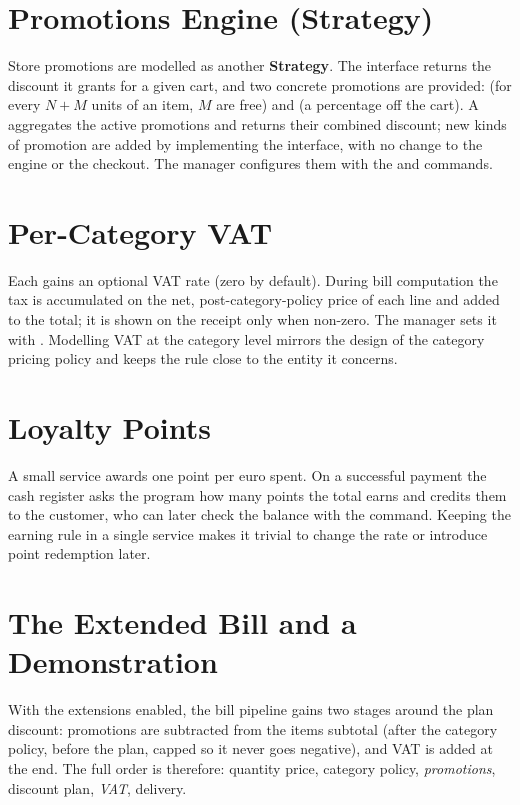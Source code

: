 \section{Promotions Engine (Strategy)}
Store promotions are modelled as another \textbf{Strategy}. The 
interface returns the discount it grants for a given cart, and two concrete
promotions are provided:  (for every $N+M$ units of
an item, $M$ are free) and  (a percentage off the
cart). A  aggregates the active promotions and returns their
combined discount; new kinds of promotion are added by implementing the interface,
with no change to the engine or the checkout. The manager configures them with the
 and  commands.

\section{Per-Category VAT}
Each  gains an optional VAT rate (zero by default). During bill
computation the tax is accumulated on the net, post-category-policy price of each
line and added to the total; it is shown on the receipt only when non-zero. The
manager sets it with . Modelling VAT at the category level
mirrors the design of the category pricing policy and keeps the rule close to the
entity it concerns.

\section{Loyalty Points}
A small  service awards one point per euro spent. On a
successful payment the cash register asks the program how many points the total
earns and credits them to the customer, who can later check the balance with the
 command. Keeping the earning rule in a single service makes it
trivial to change the rate or introduce point redemption later.

\section{The Extended Bill and a Demonstration}
With the extensions enabled, the bill pipeline gains two stages around the plan
discount: promotions are subtracted from the items subtotal (after the category
policy, before the plan, capped so it never goes negative), and VAT is added at
the end. The full order is therefore: quantity price, category policy,
\emph{promotions}, discount plan, \emph{VAT}, delivery.

